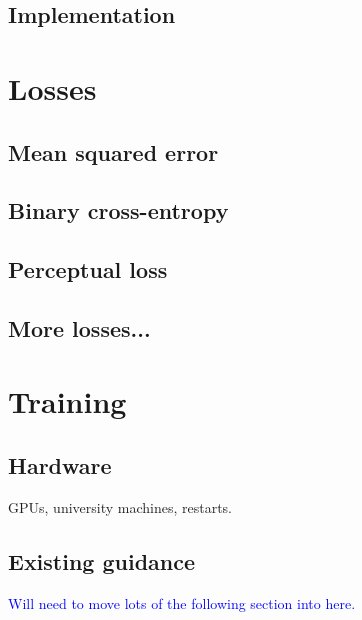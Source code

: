 \subsection{Implementation}

\section{Losses}

\subsection{Mean squared error}

\subsection{Binary cross-entropy}

\subsection{Perceptual loss}

\subsection{More losses...}

\section{Training}

\subsection{Hardware}
GPUs, university machines, restarts.

\subsection{Existing guidance}
\textcolor{blue}{Will need to move lots of the following section into here.}


